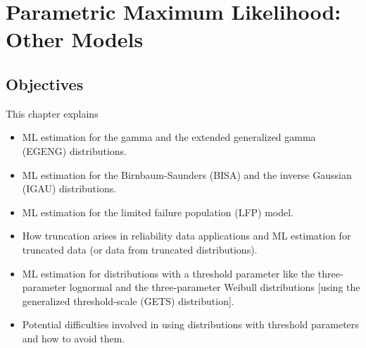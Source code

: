 
\setcounter{chapter}{10}



\chapter{Parametric Maximum Likelihood:
Other Models}
\label{chapter:ml.other.parametric}




\section*{Objectives}
This chapter explains
\begin{itemize} 
\item 
ML estimation for the gamma and
the extended generalized gamma (EGENG) distributions. 
\item 
ML estimation for the Birnbaum-Saunders (BISA) and 
the inverse Gaussian (IGAU) distributions.
\item 
ML estimation for the limited failure population (LFP) model.
\item 
How truncation arises in reliability data applications and ML
estimation for truncated data (or data from truncated distributions).
\item 
ML estimation for distributions with a threshold parameter like the
three-parameter lognormal and the three-parameter Weibull
distributions [using the generalized threshold-scale (GETS)
distribution].
\item 
Potential difficulties involved in using distributions with
threshold parameters and how to avoid them.
\end{itemize}

